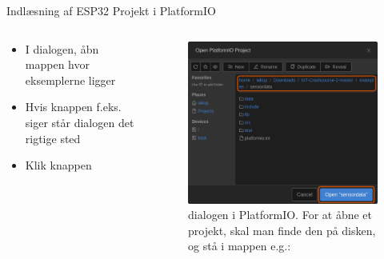 \documentclass[aspectratio=169]{beamer}
\begin{document}
\begin{frame}{Indlæsning af ESP32 Projekt i PlatformIO}
\begin{columns}
	\begin{column}{0.5\textwidth}
		\begin{textBox}
			\begin{itemize}
				\item I  dialogen, åbn mappen hvor eksemplerne ligger
				\item Hvis  knappen f.eks. siger  står dialogen det rigtige sted
				\item Klik  knappen
			\end{itemize}
		\end{textBox}
	\end{column}
	\begin{column}{0.5\textwidth}
		\begin{figure}
  			\includegraphics[height=0.7\textheight,keepaspectratio=true]{assets/pictures/pio-project-5.png}
  			\caption{ dialogen i PlatformIO. For at åbne et projekt, skal man finde den på disken, og stå i mappen e.g.: }
  			\label{fig:pio-project5}
		\end{figure}
	\end{column}
\end{columns}
\end{frame}
\end{document}
